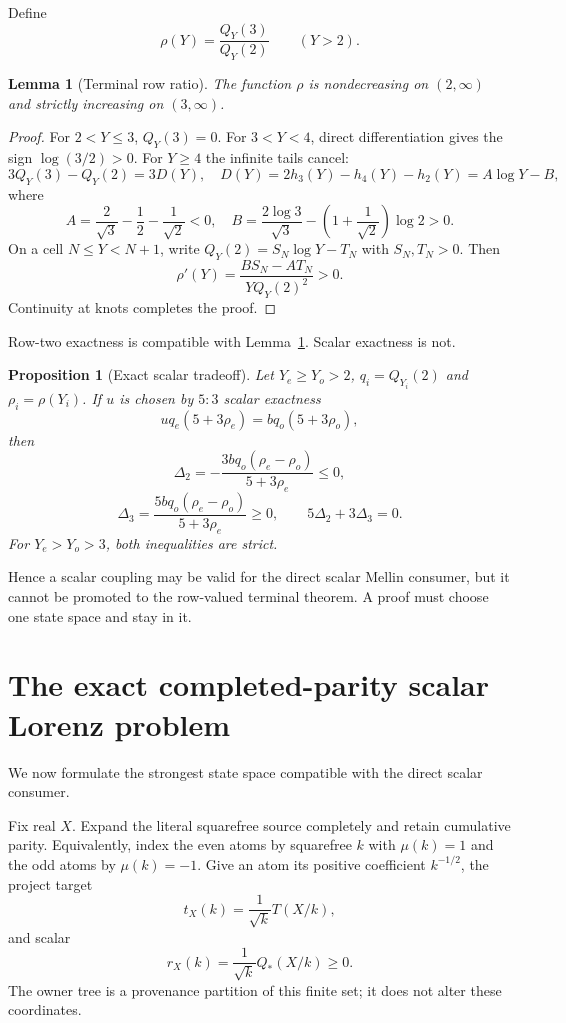 \documentclass[11pt]{article}
\newtheorem{lemma}[theorem]{Lemma}
\newtheorem{proposition}[theorem]{Proposition}
\newcommand{\1}{\mathbf 1}
\begin{document}
Define
\[
\rho(Y)=\frac{Q_Y(3)}{Q_Y(2)}\qquad(Y>2).
\]

\begin{lemma}[Terminal row ratio]\label{lem:rho}
The function $\rho$ is nondecreasing on $(2,\infty)$ and strictly increasing on $(3,\infty)$.
\end{lemma}
\begin{proof}
For $2<Y\le3$, $Q_Y(3)=0$.  For $3<Y<4$, direct differentiation gives the sign $\log(3/2)>0$.  For $Y\ge4$ the infinite tails cancel:
\[
3Q_Y(3)-Q_Y(2)=3D(Y),
\quad D(Y)=2h_3(Y)-h_4(Y)-h_2(Y)=A\log Y-B,
\]
where
\[
A=\frac2{\sqrt3}-\frac12-\frac1{\sqrt2}<0,
\quad
B=\frac{2\log3}{\sqrt3}-\left(1+\frac1{\sqrt2}\right)\log2>0.
\]
On a cell $N\le Y<N+1$, write $Q_Y(2)=S_N\log Y-T_N$ with $S_N,T_N>0$.  Then
\[
\rho'(Y)=\frac{BS_N-AT_N}{YQ_Y(2)^2}>0.
\]
Continuity at knots completes the proof.
\end{proof}

Row-two exactness is compatible with Lemma~\ref{lem:rho}.  Scalar exactness is not.

\begin{proposition}[Exact scalar tradeoff]\label{prop:tradeoff}
Let $Y_e\ge Y_o>2$, $q_i=Q_{Y_i}(2)$ and $\rho_i=\rho(Y_i)$.  If $u$ is chosen by $5{:}3$ scalar exactness
\[
uq_e(5+3\rho_e)=bq_o(5+3\rho_o),
\]
then
\[
\Delta_2=-\frac{3bq_o(\rho_e-\rho_o)}{5+3\rho_e}\le0,
\]
\[
\Delta_3=\frac{5bq_o(\rho_e-\rho_o)}{5+3\rho_e}\ge0,
\qquad5\Delta_2+3\Delta_3=0.
\]
For $Y_e>Y_o>3$, both inequalities are strict.
\end{proposition}

Hence a scalar coupling may be valid for the direct scalar Mellin consumer, but it cannot be promoted to the row-valued terminal theorem.  A proof must choose one state space and stay in it.

\section{The exact completed-parity scalar Lorenz problem}

We now formulate the strongest state space compatible with the direct scalar consumer.

Fix real $X$.  Expand the literal squarefree source completely and retain cumulative parity.  Equivalently, index the even atoms by squarefree $k$ with $\mu(k)=1$ and the odd atoms by $\mu(k)=-1$.  Give an atom its positive coefficient $k^{-1/2}$, the project target
\[
t_X(k)=\frac1{\sqrt k}T(X/k),
\]
and scalar
\[
r_X(k)=\frac1{\sqrt k}Q_*(X/k)\ge0.
\]
The owner tree is a provenance partition of this finite set; it does not alter these coordinates.
\end{document}

